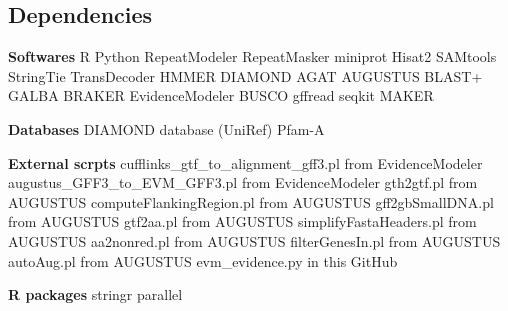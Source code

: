 \documentclass[11pt]{article}
\begin{document}
\begin{sloppypar}
\subsection{Dependencies}
\textbf{Softwares} \newline
R \newline
Python \newline
RepeatModeler \newline
RepeatMasker \newline
miniprot \newline
Hisat2 \newline
SAMtools \newline
StringTie \newline
TransDecoder \newline
HMMER \newline
DIAMOND \newline
AGAT \newline
AUGUSTUS \newline
BLAST+ \newline
GALBA \newline
BRAKER \newline
EvidenceModeler \newline
BUSCO \newline
gffread \newline
seqkit \newline
MAKER \newline
\par
\textbf{Databases} \newline
DIAMOND database (UniRef) \newline
Pfam-A \newline
\par
\textbf{External scrpts} \newline
cufflinks\_gtf\_to\_alignment\_gff3.pl from EvidenceModeler \newline
augustus\_GFF3\_to\_EVM\_GFF3.pl from EvidenceModeler \newline
gth2gtf.pl from AUGUSTUS \newline
computeFlankingRegion.pl from AUGUSTUS \newline
gff2gbSmallDNA.pl from AUGUSTUS \newline
gtf2aa.pl from AUGUSTUS \newline
simplifyFastaHeaders.pl from AUGUSTUS \newline
aa2nonred.pl from AUGUSTUS \newline
filterGenesIn.pl from AUGUSTUS \newline
autoAug.pl from AUGUSTUS \newline
evm\_evidence.py in this GitHub \newline
\par
\textbf{R packages} \newline
stringr \newline
parallel \newline
\par

\end{sloppypar}
\end{document}
